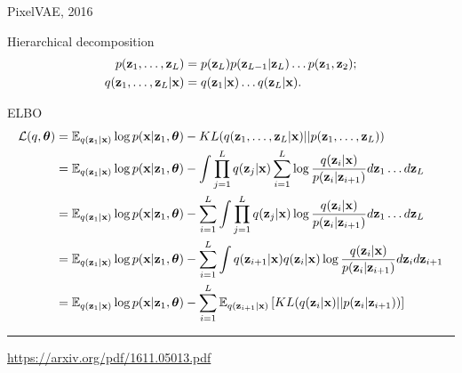 \begin{frame}{PixelVAE, 2016}
	\begin{block}{Hierarchical decomposition}
		\vspace{-1cm}
		\begin{align*}
			p(\mathbf{z}_1, \dots, \mathbf{z}_L) &= p(\mathbf{z}_L) p(\mathbf{z}_{L-1} | \mathbf{z}_L) \dots p(\mathbf{z}_1, \mathbf{z}_2); \\
			q(\mathbf{z}_1, \dots, \mathbf{z}_L | \mathbf{x}) &= q(\mathbf{z}_1 | \mathbf{x}) \dots q(\mathbf{z}_L | \mathbf{x}).
		\end{align*}
	\end{block}
	\vspace{-0.5cm}
	\begin{block}{ELBO}
		\vspace{-0.5cm}
		{\footnotesize
			\begin{align*}
				\mathcal{L}(q, \boldsymbol{\theta}) &= \mathbb{E}_{q(\mathbf{z}_1 | \mathbf{x})} \log p(\mathbf{x} | \mathbf{z}_1, \boldsymbol{\theta}) - KL(q(\mathbf{z}_1, \dots, \mathbf{z}_L | \mathbf{x}) || p(\mathbf{z}_1, \dots, \mathbf{z}_L)) \\
				&= \mathbb{E}_{q(\mathbf{z}_1 | \mathbf{x})} \log p(\mathbf{x} | \mathbf{z}_1, \boldsymbol{\theta}) - \int \prod_{j=1}^L q(\mathbf{z}_j | \mathbf{x}) \sum_{i=1}^L \log \frac{q(\mathbf{z}_i | \mathbf{x})}{p(\mathbf{z}_i | \mathbf{z}_{i + 1})} d \mathbf{z}_1 \dots d \mathbf{z}_L \\
				&= \mathbb{E}_{q(\mathbf{z}_1 | \mathbf{x})} \log p(\mathbf{x} | \mathbf{z}_1, \boldsymbol{\theta}) - \sum_{i=1}^L \int \prod_{j=1}^L q(\mathbf{z}_j | \mathbf{x}) \log \frac{q(\mathbf{z}_i | \mathbf{x})}{p(\mathbf{z}_i | \mathbf{z}_{i + 1})} d \mathbf{z}_1 \dots d \mathbf{z}_L \\
				&= \mathbb{E}_{q(\mathbf{z}_1 | \mathbf{x})} \log p(\mathbf{x} | \mathbf{z}_1, \boldsymbol{\theta}) - \sum_{i=1}^L \int q(\mathbf{z}_{i+1} | \mathbf{x}) q(\mathbf{z}_i | \mathbf{x}) \log \frac{q(\mathbf{z}_i | \mathbf{x})}{p(\mathbf{z}_i | \mathbf{z}_{i + 1})} d \mathbf{z}_i d \mathbf{z}_{i+1} \\
				&= \mathbb{E}_{q(\mathbf{z}_1 | \mathbf{x})} \log p(\mathbf{x} | \mathbf{z}_1, \boldsymbol{\theta}) - \sum_{i=1}^L \mathbb{E}_{q(\mathbf{z}_{i+1} | \mathbf{x})} \left[ KL (q(\mathbf{z}_i | \mathbf{x}) || p(\mathbf{z}_i | \mathbf{z}_{i + 1}))\right]
			\end{align*}
		}
	\end{block}
	\vfill
	\hrule\medskip
	{\scriptsize \href{https://arxiv.org/pdf/1611.05013.pdf}{https://arxiv.org/pdf/1611.05013.pdf}}
\end{frame}
